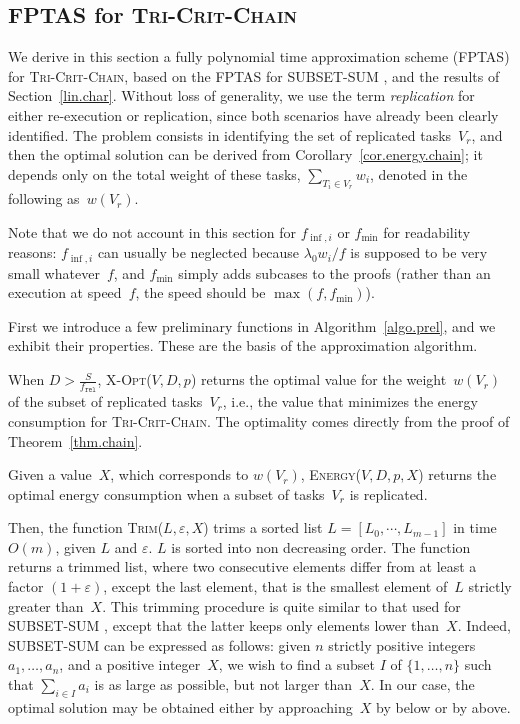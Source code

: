 \documentclass[a4paper]{article}
\theoremstyle{plain}
\theoremstyle{definition}
\theoremstyle{remark}
\newcommand{\fmin}{\ensuremath{f_{\min}}\xspace}
\newcommand{\finf}{\ensuremath{f_{\inf,i}}\xspace}
\newcommand{\fr}{\ensuremath{f_{\texttt{rel}}}\xspace}
\newcommand{\energy}{\textsc{Energy}} \newcommand{\exe}{\ensuremath{\mathcal{E}\!xe}\xspace}
\newcommand{\xopt}{\textsc{X-Opt}}
\newcommand{\trim}{\textsc{Trim}}
\newcommand{\chain}{\textsc{Tri-Crit-Chain}\xspace}
\begin{document}
\subsection{FPTAS for \chain}
\label{lin.fptas}

We derive in this section a fully polynomial time approximation scheme
(FPTAS) for \chain, based on the FPTAS for SUBSET-SUM \cite{cormen},
and the results of Section~\ref{lin.char}. Without loss of generality,
we use the term {\em replication} for either re-execution or
replication, since both scenarios have already been clearly
identified. The problem consists in identifying the set of replicated
tasks~$V_r$, and then the optimal solution can be derived from
Corollary~\ref{cor.energy.chain}; it depends only on the total weight
of these tasks, $\sum_{T_i\in V_r} w_i$, denoted in the following
as~$w(V_r)$.

Note that we do not account in this section for \finf or \fmin for
readability reasons: \finf can usually be neglected because $\lambda_0
w_i/f$ is supposed to be very small whatever~$f$, and \fmin simply
adds subcases to the proofs (rather than an execution at speed~$f$,
the speed should be $\max(f,\fmin)$).


\medskip
First we introduce a few preliminary functions in
Algorithm~\ref{algo.prel}, and we exhibit their properties. These are
the basis of the approximation algorithm. 

When $D > \frac{S}{\fr}$, \xopt($V,D,p$) returns the optimal value for
the weight~$w(V_r)$ of the subset of replicated tasks~$V_r$, i.e.,
the value that minimizes the energy consumption for \chain. 
The optimality comes directly from the proof of Theorem~\ref{thm.chain}. 





Given a value~$X$, which corresponds to $w(V_r)$, 
\energy($V,D,p,X$) returns the optimal energy consumption when a
subset of tasks~$V_r$ is replicated. 

Then, the function \trim($L,\varepsilon,X$) trims a sorted list
$L=[L_0, \cdots, L_{m-1}]$ in time~$O(m)$, given $L$ and
$\varepsilon$. $L$ is sorted into non decreasing order. The function
returns a trimmed list, where two consecutive elements differ from at
least a factor $(1+\varepsilon)$, except the last element, that is the
smallest element of~$L$ strictly greater than~$X$. This trimming
procedure is quite similar to that used for SUBSET-SUM \cite{cormen},
except that the latter keeps only elements lower than~$X$. Indeed,
SUBSET-SUM can be expressed as follows: given $n$ strictly positive
integers $a_1, \ldots, a_n$, and a positive integer~$X$, we wish to
find a subset $I$ of $\{1,\ldots, n\}$ such that \mbox{$\sum_{i\in I}a_i$}
is as large as possible, but not larger than~$X$.  
 In our case, the optimal solution may be
obtained either by approaching~$X$ by below or by above.   
\end{document}
